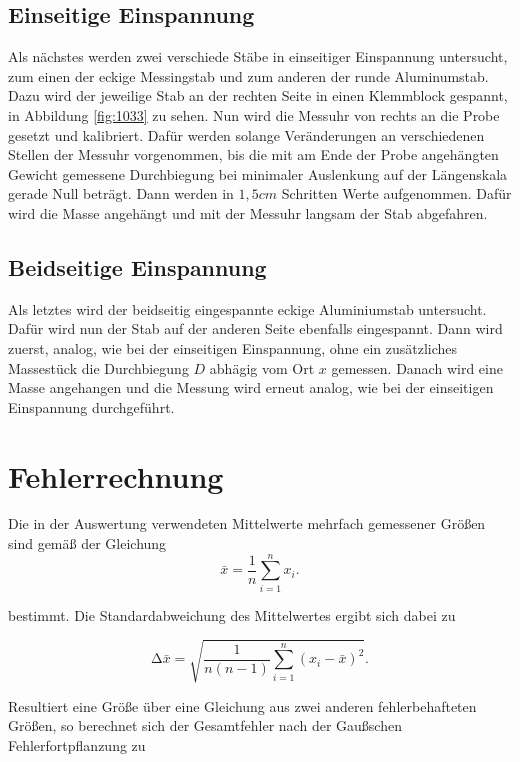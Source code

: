 \documentclass[
  bibliography=totoc,     %
  captions=tableheading,  %
  titlepage=firstiscover, %
]{scrartcl}
\begin{document}
\subsection{Einseitige Einspannung}
Als nächstes werden zwei verschiede Stäbe in einseitiger Einspannung untersucht,
zum einen der eckige Messingstab und zum anderen der runde Aluminumstab.
Dazu wird der jeweilige Stab an der rechten Seite in einen Klemmblock gespannt,
in Abbildung \ref{fig:1033} zu sehen. Nun wird die Messuhr von rechts an die
Probe gesetzt und kalibriert. Dafür werden solange Veränderungen an verschiedenen
Stellen der Messuhr vorgenommen, bis die mit am Ende der Probe angehängten
Gewicht gemessene Durchbiegung bei minimaler Auslenkung auf der Längenskala
gerade Null beträgt. Dann werden in $1,5cm$ Schritten Werte aufgenommen. Dafür
wird die Masse angehängt und mit der Messuhr langsam der Stab abgefahren.
\subsection{Beidseitige Einspannung}
Als letztes wird der beidseitig eingespannte eckige Aluminiumstab untersucht.
Dafür wird nun der Stab auf der anderen Seite ebenfalls eingespannt. Dann wird
zuerst, analog, wie bei der einseitigen Einspannung, ohne ein zusätzliches
Massestück die Durchbiegung $D$ abhägig vom Ort $x$ gemessen. Danach wird eine
Masse angehangen und die Messung wird erneut analog, wie bei der einseitigen
Einspannung durchgeführt.
\newpage
\section{Fehlerrechnung}
\label{sec:fehlerrechnung}
Die in der Auswertung verwendeten Mittelwerte mehrfach gemessener Größen sind
gemäß der Gleichung
\begin{equation}
    \bar{x}=\frac{1}{n}\sum_{i=1}^n x_i.
    \label{eq:mittelwert}
\end{equation}

bestimmt. Die Standardabweichung des Mittelwertes ergibt sich dabei zu

\begin{equation}
    \mathup{\Delta}\bar{x}=\sqrt{\frac{1}{n(n-1)}\sum_{i=1}^n\left(x_i-\bar{x}\right)^2}.
    \label{eq:standardabweichung}
\end{equation}

Resultiert eine Größe über eine Gleichung aus zwei anderen fehlerbehafteten
Größen, so berechnet sich der Gesamtfehler nach der Gaußschen
Fehlerfortpflanzung zu
\end{document}
